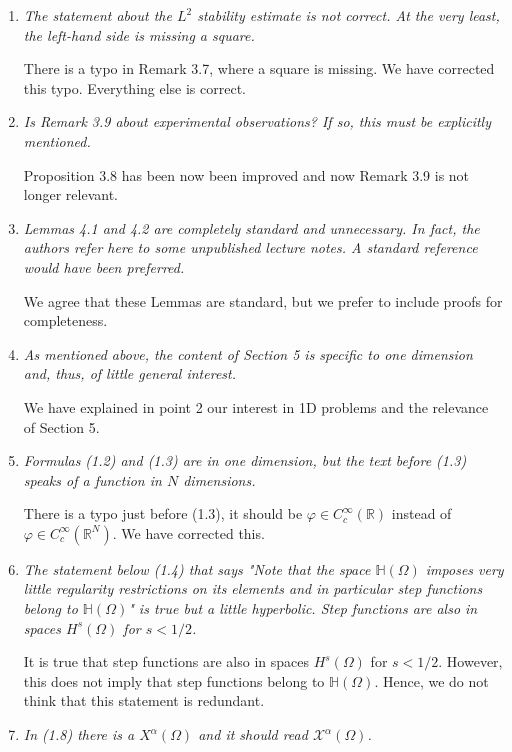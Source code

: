 \documentclass[11 pt]{article}
\numberwithin{equation}{section}
\def\R{\mathbb{R}}
\begin{document}
\begin{enumerate}
    \item \emph{The statement about the \( L^2 \) stability estimate is not correct. At the very least, the left-hand side is missing a square.}

    There is a typo in Remark 3.7, where a square is missing. We have corrected this typo. Everything else is correct.

    \item \emph{Is Remark 3.9 about experimental observations? If so, this must be explicitly mentioned.}

    Proposition 3.8 has been now been improved and now Remark 3.9 is not longer relevant.

    \item \emph{Lemmas 4.1 and 4.2 are completely standard and unnecessary. In fact, the authors refer here to some unpublished lecture notes. A standard reference would have been preferred.}

    We agree that these Lemmas are standard, but we prefer to include proofs for completeness.

    \item \emph{As mentioned above, the content of Section 5 is specific to one dimension and, thus, of little general interest.}

    We have explained in point 2 our interest in 1D problems and the relevance of Section 5.

    \item \emph{Formulas (1.2) and (1.3) are in one dimension, but the text before (1.3) speaks of a function in \( N \) dimensions.}

    There is a typo just before (1.3), it should be $\varphi\in C^\infty_c(\R)$ instead of $\varphi\in C^\infty_c(\R^N)$.  We have corrected this.

    \item \emph{The statement below (1.4) that says "Note that the space \(\mathbb H(\Omega) \) imposes very little regularity restrictions on its elements and in particular step functions belong to \( \mathbb H(\Omega) \)" is true but a little hyperbolic. Step functions are also in spaces \( H^s(\Omega) \) for \( s < 1/2 \).}

    It is true that step functions are also in spaces \( H^s(\Omega) \) for \( s < 1/2 \). However, this does not imply that step functions belong to \( \mathbb H(\Omega) \). Hence, we do not think that this statement is redundant.

    \item \emph{In (1.8) there is a $X^\alpha(\Omega)$ and it should read $\mathcal X^\alpha(\Omega)$.}


\end{enumerate}
\end{document}

